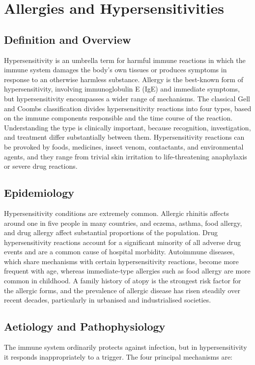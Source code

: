 \chapter{Allergies and Hypersensitivities}

\section*{Definition and Overview}
Hypersensitivity is an umbrella term for harmful immune reactions in which the immune system damages the body's own tissues or produces symptoms in response to an otherwise harmless substance. Allergy is the best-known form of hypersensitivity, involving immunoglobulin E (IgE) and immediate symptoms, but hypersensitivity encompasses a wider range of mechanisms. The classical Gell and Coombs classification divides hypersensitivity reactions into four types, based on the immune components responsible and the time course of the reaction. Understanding the type is clinically important, because recognition, investigation, and treatment differ substantially between them. Hypersensitivity reactions can be provoked by foods, medicines, insect venom, contactants, and environmental agents, and they range from trivial skin irritation to life-threatening anaphylaxis or severe drug reactions.

\section*{Epidemiology}
Hypersensitivity conditions are extremely common. Allergic rhinitis affects around one in five people in many countries, and eczema, asthma, food allergy, and drug allergy affect substantial proportions of the population. Drug hypersensitivity reactions account for a significant minority of all adverse drug events and are a common cause of hospital morbidity. Autoimmune diseases, which share mechanisms with certain hypersensitivity reactions, become more frequent with age, whereas immediate-type allergies such as food allergy are more common in childhood. A family history of atopy is the strongest risk factor for the allergic forms, and the prevalence of allergic disease has risen steadily over recent decades, particularly in urbanised and industrialised societies.

\section*{Aetiology and Pathophysiology}
The immune system ordinarily protects against infection, but in hypersensitivity it responds inappropriately to a trigger. The four principal mechanisms are:

